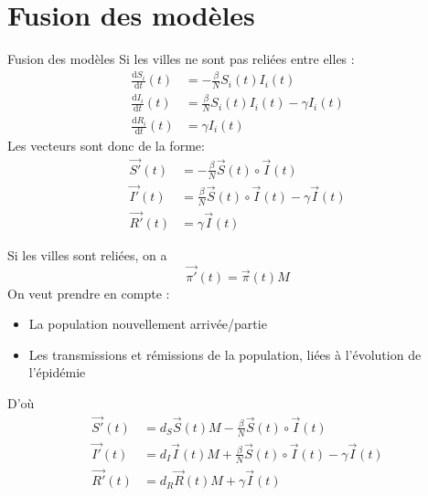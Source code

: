 \documentclass{beamer}
\theoremstyle{plain}
\theoremstyle{definition}
\theoremstyle{remark}
\begin{document}
\section{Fusion des modèles}
\begin{frame}{Fusion des modèles}
    Si les villes ne sont pas reliées entre elles :
    \begin{align*}
    \frac{\mathrm{d}S_i}{\mathrm{d}t}(t)&=-\frac{\beta}{N} S_i(t)I_i(t)\\
    \frac{\mathrm{d}I_i}{\mathrm{d}t}(t)&=\frac{\beta}{N} S_i(t)I_i(t)-\gamma I_i(t)\\
    \frac{\mathrm{d}R_i}{\mathrm{d}t}(t)&=\gamma I_i(t)
\end{align*}
Les vecteurs sont donc de la forme:
\begin{align*}
    \vec{S'}(t)&=-\frac{\beta}{N} \vec{S}(t)\circ\vec{I}(t)\\
   \vec{I'}(t)&=\frac{\beta}{N} \vec{S}(t)\circ\vec{I}(t)-\gamma \vec{I}(t)\\
    \vec{R'}(t)&=\gamma \vec{I}(t)
\end{align*}
\end{frame}{}
\begin{frame}{}
Si les villes sont reliées, on a  $$\vec{\pi'}(t)=\vec{\pi}(t)M$$
On veut prendre en compte :
\begin{itemize}
    \item La population nouvellement arrivée/partie\\
    \item Les transmissions et rémissions de la population, liées à l'évolution de l'épidémie\\
\end{itemize}
D'où
\begin{align*}
    \vec{S'}(t)&=d_S\vec{S}(t)M- \frac{\beta}{N} \vec{S}(t)\circ\vec{I}(t)\\
   \vec{I'}(t)&=d_I\vec{I}(t)M+\frac{\beta}{N} \vec{S}(t)\circ\vec{I}(t)-\gamma \vec{I}(t)\\
    \vec{R'}(t)&=d_R\vec{R}(t)M+\gamma \vec{I}(t)
\end{align*}
\end{frame}
\end{document}
